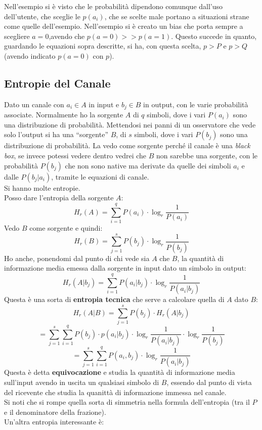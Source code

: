 \documentclass[a4paper,12pt, oneside]{book}
\begin{document}
Nell'esempio si è visto che le probabilità dipendono comunque dall'uso
dell'utente, che sceglie le $p(a_i)$, che se scelte male portano a situazioni
strane come quelle dell'esempio. Nell'esempio si è creato un bias che porta
sempre a scegliere $a=0$,avendo che $p(a=0)>>p(a=1)$. Questo succede in quanto,
guardando le equazioni sopra descritte, si ha, con questa scelta, $p>P$ e $p>Q$
(avendo indicato $p(a=0)$ con $p$).
\subsection{Entropie del Canale}
Dato un canale con $a_i\in A$ in input e $b_j\in B$ in output, con le varie
probabilità associate. Normalmente ho la sorgente $A$ di $q$ simboli, dove i
vari $P(a_i)$ sono una distribuzione di probabilità. Mettendosi 
nei panni di un osservatore che vede solo l'output si ha una ``sorgente'' $B$,
di $s$ simboli, dove i vari $P(b_j)$ sono una distribuzione di probabilità. La
vedo come sorgente perché il canale è una \textit{black box}, se invece potessi
vedere dentro vedrei che $B$ non sarebbe una sorgente, con le probabilità
$P(b_j)$ che non sono native ma derivate da quelle dei simboli $a_i$ e dalle
$P(b_j|a_i)$, tramite le equazioni di canale. \\
Si hanno molte entropie.\\
Posso dare l'entropia della sorgente $A$:
\[H_r(A)=\sum_{i=1}^q P(a_i)\cdot \log_r\frac{1}{P(a_i)}\]
Vedo $B$ come sorgente e quindi:
\[H_r(B)=\sum_{j=1}^s P(b_j)\cdot \log_r\frac{1}{P(b_j)}\]
Ho anche, ponendomi dal punto di chi vede sia $A$ che $B$, la quantità di
informazione media emessa dalla sorgente in input dato un simbolo in output:
\[H_r(A|b_j)=\sum_{i=1}^q P(a_i|b_j)\cdot \log_r\frac{1}{P(a_i|b_j)}\]
Questa è una sorta di \textbf{entropia tecnica} che serve a calcolare quella di
$A$ dato $B$:
\[H_r(A|B)=\sum_{j=1}^s P(b_j)\cdot H_r(A|b_j)\]
\[=\sum_{j=1}^s\sum_{i=1}^q P(b_j)\cdot p(a_i|b_j)\cdot
  \log_r\frac{1}{P(a_i|b_j)}\cdot \log_r\frac{1}{P(b_j)}\]
\[=\sum_{j=1}^s\sum_{i=1}^q P(a_i,b_j)\cdot \log_r\frac{1}{P(a_i|b_j)}\]
Questa è detta \textbf{equivocazione} e studia la quantità di informazione media
sull'input avendo in uscita un qualsiasi simbolo di $B$, essendo dal punto di
vista del ricevente che studia la quanittà di informazione immessa nel canale.\\
Si noti che si rompe quella sorta di simmetria nella formula dell'entropia (tra
il $P$ e il denominatore della frazione).\\
Un'altra entropia interessante è:
\end{document}
